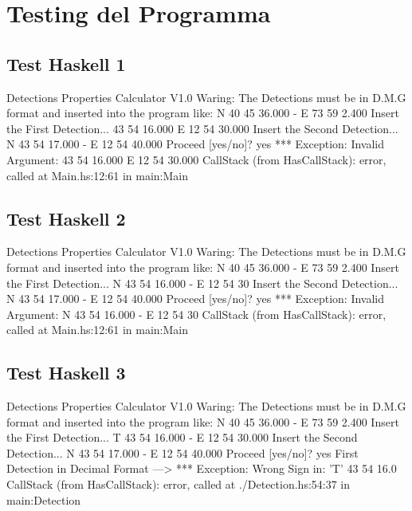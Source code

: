 \documentclass{article}
\begin{document}
\section{Testing del Programma}
\subsection*{Test Haskell 1}
	\begin{spverbatim}
		Detections Properties Calculator V1.0 
		Waring: The Detections must be in D.M.G format and inserted into the program like: N 40 45 36.000 - E 73 59 2.400
		Insert the First Detection...
		43 54 16.000  E 12 54 30.000
		Insert the Second Detection...
		N 43 54 17.000 - E 12 54 40.000
		Proceed [yes/no]?
		yes
		*** Exception: Invalid Argument: 43 54 16.000  E 12 54 30.000
		CallStack (from HasCallStack):
		error, called at Main.hs:12:61 in main:Main
	\end{spverbatim}

\subsection*{Test Haskell 2}
	\begin{spverbatim}
		Detections Properties Calculator V1.0 
		Waring: The Detections must be in D.M.G format and inserted into the program like: N 40 45 36.000 - E 73 59 2.400
		Insert the First Detection...
		N 43 54 16.000 - E 12 54 30
		Insert the Second Detection...
		N 43 54 17.000 - E 12 54 40.000
		Proceed [yes/no]?
		yes
		*** Exception: Invalid Argument: N 43 54 16.000 - E 12 54 30
		CallStack (from HasCallStack):
		error, called at Main.hs:12:61 in main:Main
	\end{spverbatim}

\subsection*{Test Haskell 3}
	\begin{spverbatim}
		Detections Properties Calculator V1.0 
		Waring: The Detections must be in D.M.G format and inserted into the program like: N 40 45 36.000 - E 73 59 2.400
		Insert the First Detection...
		T 43 54 16.000 - E 12 54 30.000
		Insert the Second Detection...
		N 43 54 17.000 - E 12 54 40.000
		Proceed [yes/no]?
		yes
		First Detection in Decimal Format ---> *** Exception: Wrong Sign in:  'T' 43 54 16.0
		CallStack (from HasCallStack):
		error, called at ./Detection.hs:54:37 in main:Detection	
	\end{spverbatim}
\end{document}
